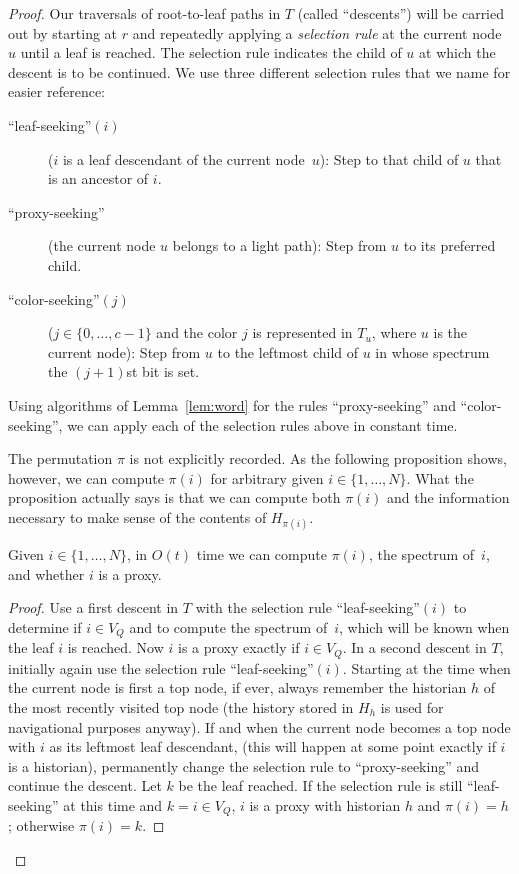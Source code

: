 \documentclass[envcountsame,envcountsect,undated,nolinenumbers]{lnthi}
\begin{document}
\begin{proof}
Our traversals of root-to-leaf paths in $T$
(called ``descents'') will be carried out by
starting at $r$ and repeatedly applying a
\emph{selection rule} at the current node~$u$
until a leaf is reached.
The selection rule indicates the child of $u$
at which the descent is to be continued.
We use three different selection rules that
we name for easier reference:

\begin{description}
\item[{\normalfont``leaf-seeking''$(i)$}]
($i$ is a leaf descendant of the current node~$u$):
Step to that child of $u$ that is an
ancestor of $i$.
\item[{\normalfont``proxy-seeking''}]
(the current node $u$ belongs to a light path):
Step from $u$ to its
preferred child.
\item[{\normalfont``color-seeking''$(j)$}]
($j\in\{0,\ldots,c-1\}$ and
the color $j$ is represented in $T_u$,
where $u$ is the current node):
Step from $u$ to the leftmost child of $u$
in whose spectrum the $(j+1)$st bit is set.
\end{description}

Using algorithms of Lemma~\ref{lem:word} for the rules
``proxy-seeking'' and ``color-seeking'',
we can apply each of the selection rules
above in constant time.

The permutation $\pi$ is not explicitly recorded.
As the following proposition shows, however,
we can compute $\pi(i)$ for arbitrary given
$i\in\{1,\ldots,N\}$.
What the proposition actually says is that we
can compute both $\pi(i)$ and the information
necessary to make sense of the 
contents of
$H_{\pi(i)}$.

\begin{proposition}
\label{prop:semi}Given $i\in\{1,\ldots,N\}$, in $O(t)$ time
we can compute $\pi(i)$, the spectrum of~$i$,
and whether $i$ is a proxy.
\end{proposition}

\begin{proof}
Use a first descent in $T$ with the selection rule
``leaf-seeking''$(i)$ to 
determine if $i\in V_Q$ and to
compute the spectrum of~$i$,
which will be known when the leaf $i$ is reached.
Now $i$ is a proxy exactly if $i\in V_Q$.
In a second descent in $T$,
initially again use the selection rule
``leaf-seeking''$(i)$.
Starting at the time when the current node
is first a top node, if ever, always remember
the historian $h$ of the
most recently visited top node
(the history stored in $H_h$ is used for navigational
purposes anyway).
If and when the current node becomes a top node
with $i$ as its leftmost leaf descendant,
(this will happen at some point exactly if
$i$ is a historian),
permanently change the
selection rule to ``proxy-seeking'' and
continue the descent.
Let $k$ be the leaf reached.
If the selection rule is still ``leaf-seeking'' at this time 
and $k=i\in V_Q$, 
$i$ is a proxy with historian $h$ and
$\pi(i)=h$;
otherwise $\pi(i)=k$.
\end{proof}


\end{proof}
\end{document}
